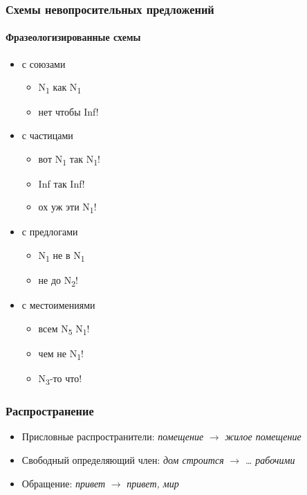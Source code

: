 \begin{frame}
  \frametitle{Схемы невопросительных предложений}
  \framesubtitle{Фразеологизированные схемы}

  \begin{multicols}{2}
    \begin{itemize}
      \item с союзами \begin{itemize}
        \item N\textsubscript{1} как N\textsubscript{1}
        \item нет чтобы Inf!
      \end{itemize}
      \item с частицами \begin{itemize}
        \item вот N\textsubscript{1} так N\textsubscript{1}!
        \item Inf так Inf!
        \item ох уж эти N\textsubscript{1}!
      \end{itemize}
      \item с предлогами \begin{itemize}
        \item N\textsubscript{1} не в N\textsubscript{1}
        \item не до N\textsubscript{2}!
      \end{itemize}
      \item с местоимениями \begin{itemize}
        \item всем N\textsubscript{5} N\textsubscript{1}!
        \item чем не N\textsubscript{1}!
        \item N\textsubscript{3}-то что!
      \end{itemize}
    \end{itemize}
  \end{multicols}
\end{frame}

\begin{frame}
  \frametitle{Распространение}

  \begin{itemize}
    \item Присловные распространители: \textit{помещение} $\rightarrow$ \textit{жилое помещение}
    \item Свободный определяющий член: \textit{дом строится} $\rightarrow$ \textit{\ldots{} рабочими}
    \item Обращение: \textit{привет} $\rightarrow$ \textit{привет, мир}
  \end{itemize}
\end{frame}

